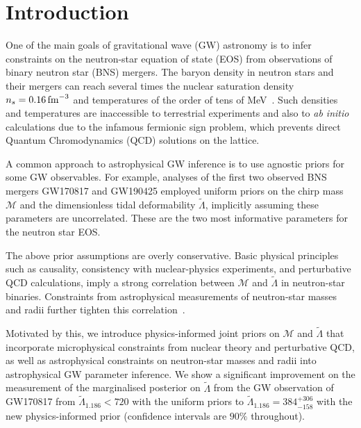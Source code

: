 \documentclass[twocolumn,linenumbers]{aastex631}
\begin{document}
		
\section{Introduction}
\label{sec:Intro}
	
One of the main goals of gravitational wave (GW) astronomy is to infer
constraints on the neutron-star equation of state (EOS) from observations
of binary neutron star (BNS) mergers. The baryon density in neutron stars
and their mergers can reach several times the nuclear saturation density
$n_s=0.16\,{\rm fm}^{-3}$ and temperatures of the order of tens of
MeV~\citep[see, e.g.,][for reviews]{Baiotti2016,
  Paschalidis2016,Radice2020b}. Such densities and temperatures are
inaccessible to terrestrial experiments and also to \textit{ab initio}
calculations due to the infamous fermionic sign problem, which prevents
direct Quantum Chromodynamics (QCD) solutions on the lattice.

A common approach to astrophysical GW inference is to use agnostic priors
for some GW observables. For example, analyses of the first two observed
BNS mergers GW170817 \citep[e.g.,][]{abbott17_170817observation,
  abbott18_170817EOS, abbott19_170817Properties} and GW190425
\citep[e.g.,][]{abbott20_190425} employed uniform priors on the chirp
mass $\mathcal{M}$ and the dimensionless tidal deformability
$\tilde{\Lambda}$, implicitly assuming these parameters are
uncorrelated. These are the two most informative parameters for the
neutron star EOS.

The above prior assumptions are overly conservative. Basic physical
principles such as causality, consistency with nuclear-physics
experiments, and perturbative QCD calculations, imply a strong
correlation between $\mathcal{M}$ and $\tilde{\Lambda}$ in neutron-star
binaries. Constraints from astrophysical measurements of neutron-star
masses and radii further tighten this correlation~\citep{Altiparmak:2022,
  Ecker:2022, Ecker:2022dlg}.

Motivated by this, we introduce physics-informed joint priors on
$\mathcal{M}$ and $\tilde{\Lambda}$ that incorporate microphysical
constraints from nuclear theory and perturbative QCD, as well as
astrophysical constraints on neutron-star masses and radii into
astrophysical GW parameter inference. We show a significant improvement
on the measurement of the marginalised posterior on $\tilde{\Lambda}$
from the GW observation of GW170817 from $\tilde{\Lambda}_{1.186} < 720$
with the uniform priors to $\tilde{\Lambda}_{1.186} = 384^{+306}_{-158}$
with the new physics-informed prior (confidence intervals are $90\%$
throughout).
\end{document}

